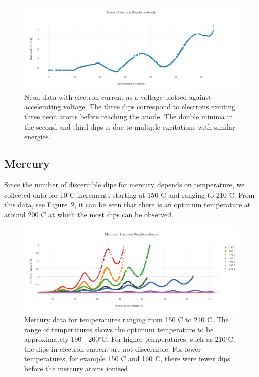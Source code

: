 \documentclass[prb,preprint]{revtex4-1}
\begin{document}
\begin{figure}[h!]
\centering

\includegraphics[width=6in]{neon_data.pdf}
\caption{Neon data with electron current as a voltage plotted against accelerating voltage. The three dips correspond to electrons exciting three neon atoms before reaching the anode. The double minima in the second and third dips is due to multiple excitations with similar energies.}

\label{neon_data}
\end{figure}


\subsection{Mercury}

Since the number of discernible dips for mercury depends on temperature, we collected data for 10$^{\circ}$C increments starting at 150$^{\circ}$C and ranging to 210$^{\circ}$C. From this data, see Figure~\ref{hg_data}, it can be seen that there is an optimum temperature at around 200$^{\circ}$C at which the most dips can be observed. 

\begin{figure}[h!]
\centering

\includegraphics[width=6in]{hg_data.pdf}
\caption{Mercury data for temperatures ranging from 150$^{\circ}$C to 210$^{\circ}$C. The range of temperatures shows the optimum temperature to be approximately 190 - 200$^{\circ}$C. For higher temperatures, such as 210$^{\circ}$C, the dips in electron current are not discernible. For lower temperatures, for example 150$^{\circ}$C and 160$^{\circ}$C, there were fewer dips before the mercury atoms ionized.}

\label{hg_data}
\end{figure}
\end{document}
